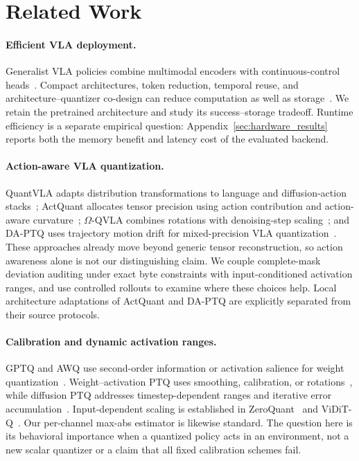 \section{Related Work}
\label{sec:related}

\paragraph{Efficient VLA deployment.}
Generalist VLA policies combine multimodal encoders with continuous-control heads~\cite{brohan2023rt2,octo2024,kim2024openvla,black2024pi0,intelligence2025pi05,bjorck2025groot}. Compact architectures, token reduction, temporal reuse, and architecture--quantizer co-design can reduce computation as well as storage~\cite{shukor2025smolvla,zhang2025molevla,yang2025efficientvla,xu2025vlacache,fang2025sqapvla}. We retain the pretrained architecture and study its success--storage tradeoff. Runtime efficiency is a separate empirical question: Appendix~\ref{sec:hardware_results} reports both the memory benefit and latency cost of the evaluated backend.

\paragraph{Action-aware VLA quantization.}
QuantVLA adapts distribution transformations to language and diffusion-action stacks~\cite{zhang2026quantvla}; ActQuant allocates tensor precision using action contribution and action-aware curvature~\cite{akbari2026actquant}; $\Omega$-QVLA combines rotations with denoising-step scaling~\cite{wang2026omegaqvla}; and DA-PTQ uses trajectory motion drift for mixed-precision VLA quantization~\cite{xu2026daptq}. These approaches already move beyond generic tensor reconstruction, so action awareness alone is not our distinguishing claim. We couple complete-mask deviation auditing under exact byte constraints with input-conditioned activation ranges, and use controlled rollouts to examine where these choices help. Local architecture adaptations of ActQuant and DA-PTQ are explicitly separated from their source protocols.

\paragraph{Calibration and dynamic activation ranges.}
GPTQ and AWQ use second-order information or activation salience for weight quantization~\cite{frantar2022gptq,lin2024awq}. Weight--activation PTQ uses smoothing, calibration, or rotations~\cite{xiao2023smoothquant,shao2024omniquant,ashkboos2024quarot,lin2024duquant,liu2025spinquant,sun2025flatquant}, while diffusion PTQ addresses timestep-dependent ranges and iterative error accumulation~\cite{shang2023ptq4dm,li2023qdiffusion,wu2024ptq4dit,chen2024qdit,zhao2024mixdq}. Input-dependent scaling is established in ZeroQuant~\cite{yao2022zeroquant} and ViDiT-Q~\cite{zhao2024viditq}. Our per-channel max-abs estimator is likewise standard. The question here is its behavioral importance when a quantized policy acts in an environment, not a new scalar quantizer or a claim that all fixed calibration schemes fail.

